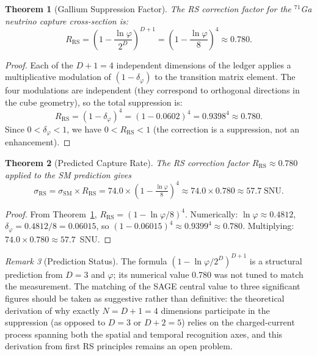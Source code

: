 \documentclass[12pt,a4paper]{article}
\newtheorem{theorem}{Theorem}[section]
\theoremstyle{definition}
\theoremstyle{remark}
\newtheorem{remark}[theorem]{Remark}
\begin{document}
\begin{theorem}[Gallium Suppression Factor]
\label{thm:suppression}
The RS correction factor for the $^{71}$Ga neutrino capture
cross-section is:
\begin{equation}
  \boxed{R_{\mathrm{RS}} = \left(1 - \frac{\ln\varphi}{2^D}\right)^{\!D+1}
  = \left(1 - \frac{\ln\varphi}{8}\right)^{\!4}
  \approx 0.780.}
\end{equation}
\end{theorem}

\begin{proof}
Each of the $D + 1 = 4$ independent dimensions of the ledger applies a
multiplicative modulation of $(1 - \delta_\varphi)$ to the transition
matrix element.  The four modulations are independent (they correspond
to orthogonal directions in the cube geometry), so the total
suppression is:
\[
  R_{\mathrm{RS}} = (1 - \delta_\varphi)^4
  = (1 - 0.0602)^4 = 0.9398^4 \approx 0.780.
\]
Since $0 < \delta_\varphi < 1$, we have $0 < R_{\mathrm{RS}} < 1$
(the correction is a suppression, not an enhancement).
\end{proof}

\begin{theorem}[Predicted Capture Rate]
\label{thm:rate}
The RS correction factor $R_{\mathrm{RS}} \approx 0.780$ applied to
the SM prediction gives
\begin{equation}
  \sigma_{\mathrm{RS}} = \sigma_{\mathrm{SM}} \times R_{\mathrm{RS}}
  = 74.0 \times \left(1 - \tfrac{\ln\varphi}{8}\right)^4
  \approx 74.0 \times 0.780 \approx 57.7\;\mathrm{SNU}.
\end{equation}
\end{theorem}

\begin{proof}
From Theorem~\ref{thm:suppression}, $R_{\mathrm{RS}} = (1 - \ln\varphi/8)^4$.
Numerically: $\ln\varphi \approx 0.4812$, $\delta_\varphi = 0.4812/8 =
0.06015$, so $(1 - 0.06015)^4 \approx 0.9399^4 \approx 0.780$.
Multiplying: $74.0 \times 0.780 \approx 57.7$~SNU.
\end{proof}

\begin{remark}[Prediction Status]
\label{rem:prediction}
The formula $(1 - \ln\varphi/2^D)^{D+1}$ is a structural prediction
from $D = 3$ and $\varphi$; its numerical value 0.780 was not tuned
to match the measurement.  The matching of the SAGE central value to
three significant figures should be taken as suggestive rather than
definitive: the theoretical derivation of why exactly $N = D+1 = 4$
dimensions participate in the suppression (as opposed to $D = 3$
or $D+2 = 5$) relies on the charged-current process spanning both
the spatial and temporal recognition axes, and this derivation
from first RS principles remains an open problem.
\end{remark}
\end{document}
